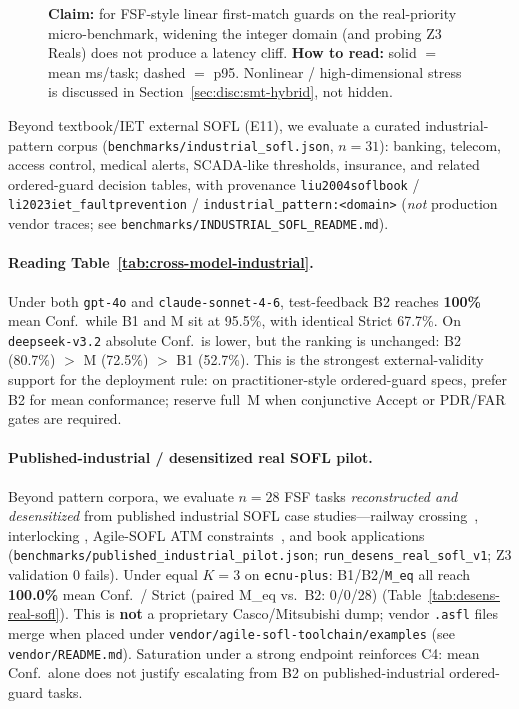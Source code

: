 

\begin{figure}[t]
  \centering
  \caption{\textbf{Claim:} for FSF-style linear first-match guards on the
    real-priority micro-benchmark, widening the integer domain (and probing
    Z3 Reals) does not produce a latency cliff.
    \textbf{How to read:} solid $=$ mean ms/task; dashed $=$ p95.
    Nonlinear / high-dimensional stress is discussed in
    Section~\ref{sec:disc:smt-hybrid}, not hidden.}
  \label{fig:smt-domain-latency}
\end{figure}

Beyond textbook/IET external SOFL (E11), we evaluate a curated
industrial-pattern corpus
(\texttt{benchmarks/industrial\_sofl.json}, $n{=}31$): banking, telecom,
access control, medical alerts, SCADA-like thresholds, insurance, and related
ordered-guard decision tables, with provenance
\texttt{liu2004soflbook} / \texttt{li2023iet\_faultprevention} /
\texttt{industrial\_pattern:<domain>}
(\emph{not} production vendor traces; see
\texttt{benchmarks/INDUSTRIAL\_SOFL\_README.md}).



\paragraph{Reading Table~\ref{tab:cross-model-industrial}.}
Under both \texttt{gpt-4o} and \texttt{claude-sonnet-4-6}, test-feedback B2
reaches \textbf{100\%} mean Conf.\ while B1 and M sit at 95.5\%, with
identical Strict 67.7\%.
On \texttt{deepseek-v3.2} absolute Conf.\ is lower, but the ranking is
unchanged: B2 (80.7\%) $>$ M (72.5\%) $>$ B1 (52.7\%).
This is the strongest external-validity support for the deployment rule:
on practitioner-style ordered-guard specs, prefer B2 for mean conformance;
reserve full~M when conjunctive $\mathrm{Accept}$ or PDR/FAR gates are required.

\paragraph{Published-industrial / desensitized real SOFL pilot.}
Beyond pattern corpora, we evaluate $n{=}28$ FSF tasks
\emph{reconstructed and desensitized} from published industrial SOFL case
studies---railway crossing~\cite{liu1998railwaycrossing}, interlocking
\cite{luo2017railway}, Agile-SOFL ATM constraints~\cite{li2022qrs_companion},
and book applications~\cite{liu2004soflbook,li2023iet_faultprevention}
(\texttt{benchmarks/published\_industrial\_pilot.json};
\texttt{run\_desens\_real\_sofl\_v1}; Z3 validation 0 fails).
Under equal $K{=}3$ on \texttt{ecnu-plus}: B1/B2/\texttt{M\_eq} all reach
\textbf{100.0\%} mean Conf.\ / Strict (paired M\_eq vs.\ B2: 0/0/28)
(Table~\ref{tab:desens-real-sofl}).
This is \textbf{not} a proprietary Casco/Mitsubishi dump; vendor
\texttt{.asfl} files merge when placed under
\texttt{vendor/agile-sofl-toolchain/examples} (see \texttt{vendor/README.md}).
Saturation under a strong endpoint reinforces C4: mean Conf.\ alone does not
justify escalating from B2 on published-industrial ordered-guard tasks.

